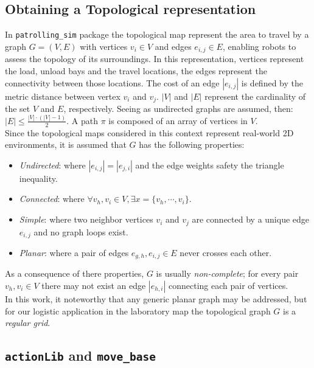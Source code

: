 \subsection{Obtaining a Topological representation}
In \texttt{patrolling\_sim} package the topological map represent the area to travel 
by a graph $G = (V,E)$ with vertices $v_i \in V$ and edges $e_{i,j} \in E$, enabling 
robots to assess the topology of its surroundings. In this representation, vertices
represent the load, unload bays and the travel locations, the edges represent
the connectivity between those locations. The cost of an edge $|e_{i,j}|$ is defined  
by the metric distance between vertex $v_i$ and $v_j$. $|V|$ and $|E|$ represent 
the cardinality of the set $V$ and $E$, respectively. Seeing as undirected graphs are
assumed, then: $|E| \le \frac{|V| \cdot (|V| -1)}{2}$. A path $\pi$ is composed 
of an array of vertices in $V$.
\\
Since the topological maps considered in this context represent real-world 2D environments,
it is assumed that $G$ has the following properties:
\begin{itemize}
    \item \textit{Undirected}: where $|e_{i,j}| = |e_{j,i}|$ and the edge weights safety the triangle inequality.
    \item \textit{Connected}: where $\forall v_h,v_i \in V, \exists x = \{v_{h}, \cdots , v_{i}\}$.
    \item \textit{Simple}: where two neighbor vertices $v_{i}$ and $v_{j}$ are connected 
            by a unique edge $e_{i,j}$ and no graph loops exist.
    \item \textit{Planar}: where a pair of edges $e_{g,h}, e_{i,j} \in E$ never crosses each other. 
\end{itemize}
As a consequence of there properties, $G$ is usually \textit{non-complete}; for 
every pair $v_h, v_i \in V$ there may not exist an edge $|e_{h,i}|$ connecting 
each pair of vertices.
\\
In this work, it noteworthy that any generic planar graph may be addressed, but for 
our logistic application in the laboratory map the topological graph $G$ is a \textit{regular grid}.


\subsection{\texttt{actionLib} and \texttt{move\_base}}

